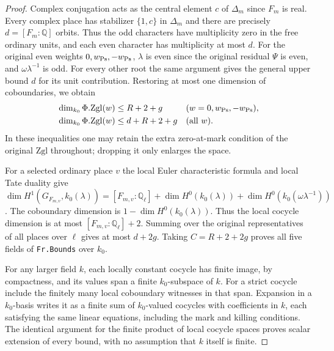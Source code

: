 \begin{proof}
Complex conjugation acts as the central element $c$ of
$\Delta_m$ since $F_m$ is real. Every complex place has
stabilizer $\{1,c\}$ in $\Delta_m$ and there are precisely
$d=[F_m:\mathbb Q]$ orbits. Thus the odd characters have
multiplicity zero in the free ordinary units, and each
even character has multiplicity at most $d$. For the original
even weights $0,w_{\rm Ps},-w_{\rm Ps}$, $\lambda$ is even
since the original residual $\Psi$ is even, and
$\omega\lambda^{-1}$ is odd. For every other root the
same argument gives the general upper bound $d$ for its
unit contribution. Restoring at most one dimension of
coboundaries, we obtain
\[
 \begin{aligned}
 \dim_{k_0}\Phi.\mathrm{Zgl}(w)&\le R+2+g
     &&(w=0,w_{\rm Ps},-w_{\rm Ps}),\\
 \dim_{k_0}\Phi.\mathrm{Zgl}(w)&\le d+R+2+g
     &&(\text{all }w).
 \end{aligned}
\]
In these inequalities one may retain the extra zero-at-mark
condition of the original $\mathrm{Zgl}$ throughout; dropping
it only enlarges the space.

For a selected ordinary place $v$ the local Euler characteristic
formula and local Tate duality give
$\dim H^1(G_{F_{m,v}},k_0(\lambda))
=[F_{m,v}:\mathbb Q_\ell]+\dim H^0(k_0(\lambda))
+\dim H^0(k_0(\omega\lambda^{-1}))$.
The coboundary dimension is $1-\dim H^0(k_0(\lambda))$.
Thus the local cocycle dimension is at most
$[F_{m,v}:\mathbb Q_\ell]+2$. Summing over the original
representatives of all places over $\ell$ gives at most
$d+2g$. Taking $C=R+2+2g$ proves all five fields of
\texttt{Fr.Bounds} over $k_0$.

For any larger field $k$, each locally constant cocycle has
finite image, by compactness, and its values span a finite
$k_0$-subspace of $k$. For a strict cocycle include the
finitely many local coboundary witnesses in that span.
Expansion in a $k_0$-basis writes it as a finite sum of
$k_0$-valued cocycles with coefficients in $k$, each satisfying
the same linear equations, including the mark and killing
conditions. The identical argument for the finite product
of local cocycle spaces proves scalar extension of every
bound, with no assumption that $k$ itself is finite.


\end{proof}

